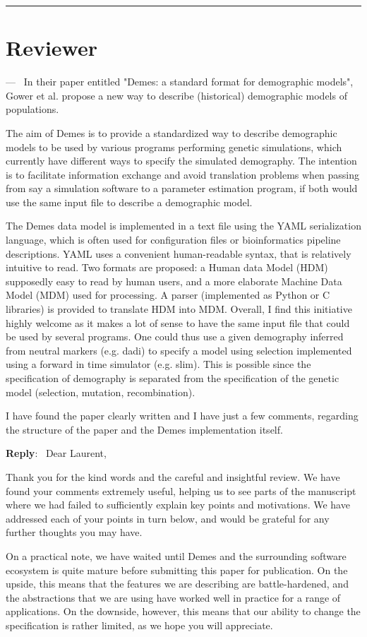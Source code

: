 \documentclass[11pt]{article}
\newcounter{reviewer}
\newcounter{point}[reviewer]
\renewcommand{\thepoint}{\thereviewer.\arabic{point}}
\newcommand{\reviewersection}{\stepcounter{reviewer} \bigskip \hrule
                  \section*{Reviewer \thereviewer}}
\newenvironment{point}
   {\refstepcounter{point} \bigskip \noindent {\textbf{Reviewer~Point~\thepoint} } ---\ }
   {\par }
\newenvironment{reply}
   {\medskip \noindent \begin{sf}\textbf{Reply}:\  }
   {\medskip \end{sf}}
\begin{document}
\reviewersection

\begin{point}
In their paper entitled "Demes: a standard format for demographic models",
Gower et al. propose a new way to describe (historical) demographic models of
populations.

The aim of Demes is to provide a standardized way to describe demographic
models to be used by various programs performing genetic simulations, which
currently have different ways to specify the simulated demography. The
intention is to facilitate information exchange and avoid translation problems
when passing from say a simulation software to a parameter estimation program,
if both would use the same input file to describe a demographic model.

The Demes data model is implemented in a text file using the YAML serialization
language, which is often used for configuration files or bioinformatics
pipeline descriptions. YAML uses a convenient human-readable syntax, that is
relatively intuitive to read. Two formats are proposed: a Human data Model
(HDM) supposedly easy to read by human users, and a more elaborate Machine Data
Model (MDM) used for processing. A parser (implemented as Python or C
libraries) is provided to translate HDM into MDM. Overall, I find this
initiative highly welcome as it makes a lot of sense to have the same input
file that could be used by several programs. One could thus use a given
demography inferred from neutral markers (e.g. dadi) to specify a model using
selection implemented using a forward in time simulator (e.g. slim). This is
possible since the specification of demography is separated from the
specification of the genetic model (selection, mutation, recombination).

I have found the paper clearly written and I have just a few comments,
regarding the structure of the paper and the Demes implementation itself.
\end{point}
\begin{reply}
Dear Laurent,

Thank you for the kind words and the careful and insightful review.
We have found your comments extremely useful, helping us to see
parts of the manuscript where we had failed to sufficiently explain
key points and motivations. We have addressed each of your points
in turn below, and would be grateful for any further thoughts
you may have.

On a practical note, we have waited until Demes and the surrounding
software ecosystem is quite mature before submitting this paper
for publication. On the upside, this means that the features
we are describing are battle-hardened, and the abstractions that
we are using have worked well in practice for a range of
applications. On the downside, however, this means that our ability
to change the specification is rather limited, as we hope you
will appreciate.

\end{reply}
\end{document}
